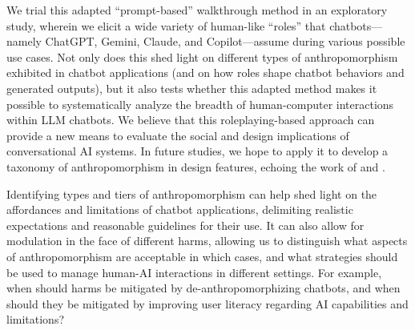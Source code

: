 We trial this adapted ``prompt-based'' walkthrough method in an exploratory study, wherein we elicit a wide variety of human-like ``roles'' that chatbots---namely ChatGPT, Gemini, Claude, and Copilot---assume during various possible use cases. Not only does this shed light on different types of anthropomorphism exhibited in chatbot applications (and on how roles shape chatbot behaviors and generated outputs), but it also tests whether this adapted method makes it possible to systematically analyze the breadth of human-computer interactions within LLM chatbots. We believe that this roleplaying-based approach can provide a new means to evaluate the social and design implications of conversational AI systems. In future studies, we hope to apply it to develop a taxonomy of anthropomorphism in design features, echoing the work of \citet{inie2024ai} and \citet{abercrombie-etal-2023-mirages}.


Identifying types and tiers of anthropomorphism can help shed light on the affordances and limitations of chatbot applications, delimiting realistic expectations and reasonable guidelines for their use. It can also allow for modulation in the face of different harms, allowing us to distinguish what aspects of anthropomorphism are acceptable in which cases, and what strategies should be used to manage human-AI interactions in different settings. For example, when should harms be mitigated by de-anthropomorphizing chatbots, and when should they be mitigated by improving user literacy regarding AI capabilities and limitations? 